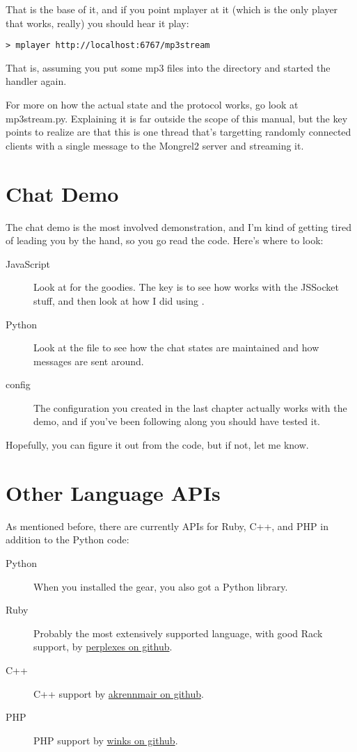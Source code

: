 That is the base of it, and if you point mplayer at it (which is
the only player that works, really) you should hear it play:

\begin{lstlisting}
> mplayer http://localhost:6767/mp3stream
\end{lstlisting}

That is, assuming you put some mp3 files into the directory and
started the handler again.

For more on how the actual state and the protocol works, go look
at mp3stream.py.  Explaining it is far outside the scope of this manual,
but the key points to realize are that this is one thread that's
targetting randomly connected clients with a single message to the
Mongrel2 server and streaming it.


\section{Chat Demo}

The chat demo is the most involved demonstration, and I'm kind of getting
tired of leading you by the hand, so you go read the code.  Here's where
to look:

\begin{description}
\item [JavaScript] Look at  for the goodies.
    The key is to see how  works with the JSSocket stuff,
    and then look at how I did  using .
\item [Python] Look at the  file to see how
    the chat states are maintained and how messages are sent around.
\item [config] The configuration you created in the last chapter
    actually works with the demo, and if you've been following along
    you should have tested it.
\end{description}

Hopefully, you can figure it out from the code, but if not, let me know.


\section{Other Language APIs}

As mentioned before, there are currently APIs for Ruby, C++, and PHP in
addition to the Python code:


\begin{description}
\item [Python] When you installed the  gear, you also got a  Python library.
\item [Ruby] Probably the most extensively supported language, with good Rack support, by \href{http://github.com/perplexes/m2r}{perplexes on github}.
\item [C++] C++ support by \href{http://github.com/akrennmair/mongrel2-cpp}{akrennmair on github}.
\item [PHP] PHP support by \href{http://github.com/winks/m2php}{winks on github}.
\end{description}


